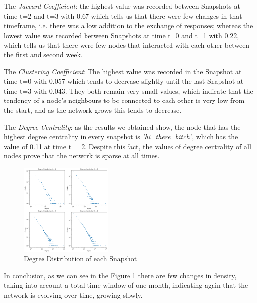 \documentclass[sigchi]{acmart}
\begin{document}
\noindent The \textit{Jaccard Coefficient}: the highest value was recorded between Snapshots at time t=2 and t=3 with 0.67 which tells us that there were few changes in that timeframe, i.e. there was a low addition to the exchange of responses; whereas the lowest value was recorded between Snapshots at time t=0 and t=1 with 0.22, which tells us that there were few nodes that interacted with each other between the first and second week.

\noindent The \textit{Clustering Coefficient}: The highest value was recorded in the Snapshot at time t=0 with 0.057 which tends to decrease slightly until the last Snapshot at time t=3 with 0.043.
They both remain very small values, which indicate that the tendency of a node's neighbours to be connected to each other is very low from the start, and as the network grows this tends to decrease.

\noindent The \textit{Degree Centrality}: as the results we obtained show, the node that has the highest degree centrality in every snapshot is \textit{'hi\_there\_bitch'}, which has the value of 0.11 at time t = 2. Despite this fact, the values of degree centrality of all nodes prove that the network is sparse at all times.

\begin{figure}[H]
  \centering
  \includegraphics[width=0.4\textwidth]{img/dd_snapshot.png}
  \caption{Degree Distribution of each Snapshot}
  \label{fig:Degree Distribution Snapshot}
\end{figure}


In conclusion, as we can see in the Figure \ref{fig:Degree Distribution Snapshot} there are few changes in density, taking into account a total time window of one month, indicating again that the network is evolving over time, growing slowly.
\end{document}

